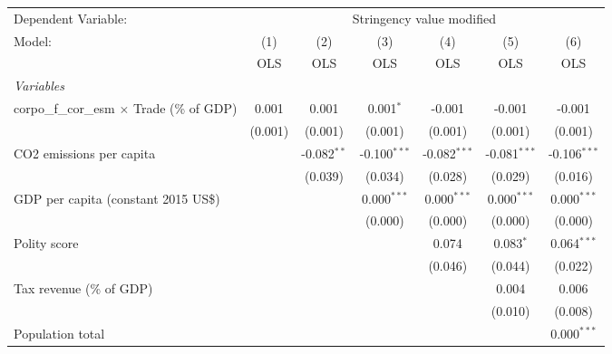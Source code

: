 
\begingroup
\centering
\begin{tabular}{lcccccc}
   \toprule
   Dependent Variable: & \multicolumn{6}{c}{Stringency value modified}\\
   Model:                                             & (1)     & (2)           & (3)            & (4)            & (5)            & (6)\\  
                                                      &  OLS    & OLS           & OLS            & OLS            & OLS            & OLS\\  
   \midrule
   \emph{Variables}\\
   corpo\_f\_cor\_esm $\times$ Trade (\% of GDP)      & 0.001   & 0.001         & 0.001$^{*}$    & -0.001         & -0.001         & -0.001\\   
                                                      & (0.001) & (0.001)       & (0.001)        & (0.001)        & (0.001)        & (0.001)\\   
   CO2 emissions per capita                           &         & -0.082$^{**}$ & -0.100$^{***}$ & -0.082$^{***}$ & -0.081$^{***}$ & -0.106$^{***}$\\   
                                                      &         & (0.039)       & (0.034)        & (0.028)        & (0.029)        & (0.016)\\   
   GDP per capita (constant 2015 US\$)                &         &               & 0.000$^{***}$  & 0.000$^{***}$  & 0.000$^{***}$  & 0.000$^{***}$\\   
                                                      &         &               & (0.000)        & (0.000)        & (0.000)        & (0.000)\\   
   Polity score                                       &         &               &                & 0.074          & 0.083$^{*}$    & 0.064$^{***}$\\   
                                                      &         &               &                & (0.046)        & (0.044)        & (0.022)\\   
   Tax revenue (\% of GDP)                            &         &               &                &                & 0.004          & 0.006\\   
                                                      &         &               &                &                & (0.010)        & (0.008)\\   
   Population total                                   &         &               &                &                &                & 0.000$^{***}$\\   

\end{tabular}
